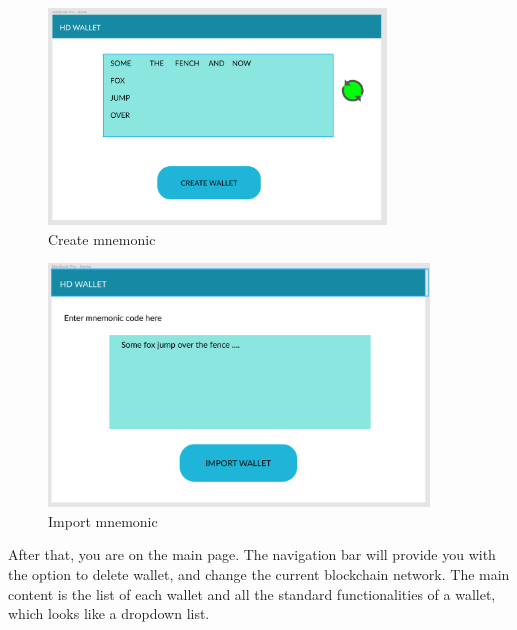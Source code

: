 \begin{figure}[!h]
  \centering
  \includegraphics[width=0.8\textwidth]{images/component02.png}
  \caption[Create mnemonic]{Create mnemonic}
  \label{fig:create_mnemonic}
\end{figure}
\bigbreak
\begin{figure}[!h]
  \centering
  \includegraphics[width=0.9\textwidth]{images/component03.png}
  \caption[Import mnemonic]{Import mnemonic}
  \label{fig:import_mnemonic}
\end{figure}

After that, you are on the main page. The navigation bar will provide you with the option to delete wallet, and change the current blockchain network. The main content is the list of each wallet and all the standard functionalities of a wallet, which looks like a dropdown list.\\

